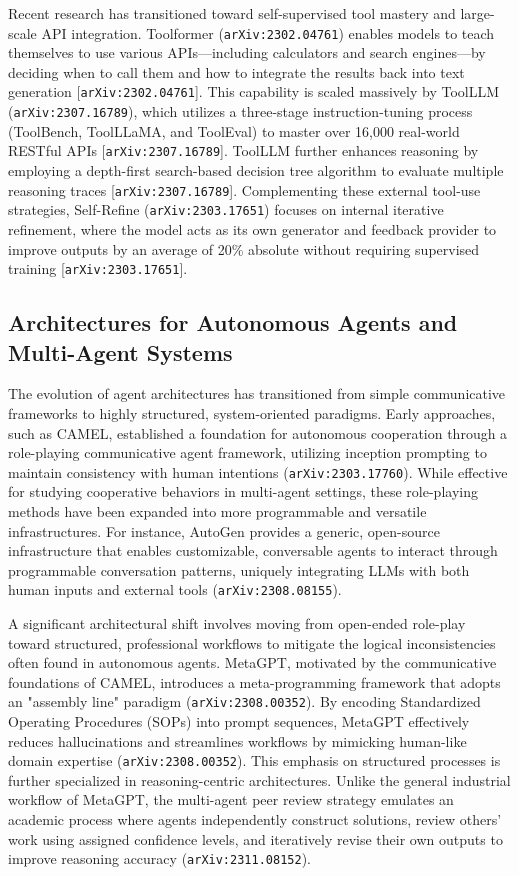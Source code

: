 \documentclass[11pt]{article}
\begin{document}
Recent research has transitioned toward self-supervised tool mastery and large-scale API integration. Toolformer (\texttt{arXiv:2302.04761}) enables models to teach themselves to use various APIs—including calculators and search engines—by deciding when to call them and how to integrate the results back into text generation [\texttt{arXiv:2302.04761}]. This capability is scaled massively by ToolLLM (\texttt{arXiv:2307.16789}), which utilizes a three-stage instruction-tuning process (ToolBench, ToolLLaMA, and ToolEval) to master over 16,000 real-world RESTful APIs [\texttt{arXiv:2307.16789}]. ToolLLM further enhances reasoning by employing a depth-first search-based decision tree algorithm to evaluate multiple reasoning traces [\texttt{arXiv:2307.16789}]. Complementing these external tool-use strategies, Self-Refine (\texttt{arXiv:2303.17651}) focuses on internal iterative refinement, where the model acts as its own generator and feedback provider to improve outputs by an average of 20\% absolute without requiring supervised training [\texttt{arXiv:2303.17651}].

\subsection{Architectures for Autonomous Agents and Multi-Agent Systems}

The evolution of agent architectures has transitioned from simple communicative frameworks to highly structured, system-oriented paradigms. Early approaches, such as CAMEL, established a foundation for autonomous cooperation through a role-playing communicative agent framework, utilizing inception prompting to maintain consistency with human intentions (\texttt{arXiv:2303.17760}). While effective for studying cooperative behaviors in multi-agent settings, these role-playing methods have been expanded into more programmable and versatile infrastructures. For instance, AutoGen provides a generic, open-source infrastructure that enables customizable, conversable agents to interact through programmable conversation patterns, uniquely integrating LLMs with both human inputs and external tools (\texttt{arXiv:2308.08155}).

A significant architectural shift involves moving from open-ended role-play toward structured, professional workflows to mitigate the logical inconsistencies often found in autonomous agents. MetaGPT, motivated by the communicative foundations of CAMEL, introduces a meta-programming framework that adopts an "assembly line" paradigm (\texttt{arXiv:2308.00352}). By encoding Standardized Operating Procedures (SOPs) into prompt sequences, MetaGPT effectively reduces hallucinations and streamlines workflows by mimicking human-like domain expertise (\texttt{arXiv:2308.00352}). This emphasis on structured processes is further specialized in reasoning-centric architectures. Unlike the general industrial workflow of MetaGPT, the multi-agent peer review strategy emulates an academic process where agents independently construct solutions, review others' work using assigned confidence levels, and iteratively revise their own outputs to improve reasoning accuracy (\texttt{arXiv:2311.08152}).
\end{document}
